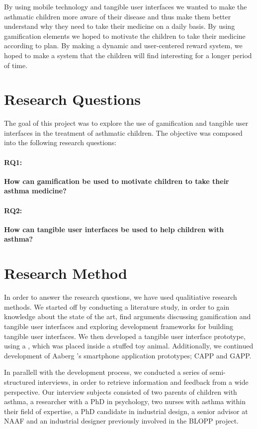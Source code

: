 By using mobile technology and tangible user interfaces we wanted to make the asthmatic children more aware of their disease and thus make them better understand why they need to take their medicine on a daily basis. 
By using gamification elements we hoped to motivate the children to take their medicine according to plan. By making a dynamic and user-centered reward system, we hoped to make a system that the children will find interesting for a longer period of time.  



\section{Research Questions}
\label{sec:researchquestions}
The goal of this project was to explore the use of gamification and tangible user interfaces in the treatment of asthmatic children. The objective was composed into the following research questions: 

\paragraph{RQ1:}
\textbf{How can gamification be used to motivate children to take their asthma medicine?}


\paragraph{RQ2:}
\textbf{How can tangible user interfaces be used to help children with asthma?}


\section{Research Method}
\label{sec:researchmethod}
In order to answer the research questions, we have used qualitiative research methods. 
We started off by conducting a literature study, in order to gain knowledge about the state of the art, find arguments discussing gamification and tangible user interfaces and exploring development frameworks for building tangible user interfaces. We then developed a tangible user interface prototype, using a \rpi{}, which was placed inside a stuffed toy animal. Additionally, we continued development of Aaberg \etal{}'s smartphone application prototypes; CAPP and GAPP. 

In parallell with the development process, we conducted a series of semi-structured interviews, in order to retrieve information and feedback from a wide perspective. Our interview subjects consisted of two parents of children with asthma, a researcher with a PhD in psychology, two nurses with asthma within their field of expertise, a PhD candidate in industrial design, a senior advisor at NAAF and an industrial designer previously involved in the BLOPP project. 

